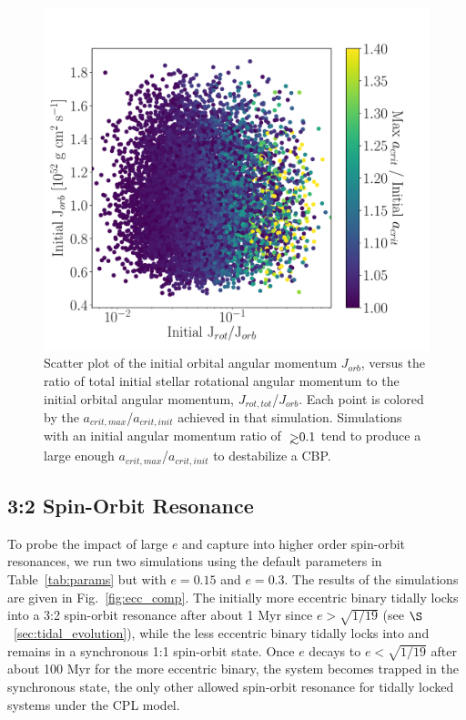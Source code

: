 \begin{figure}[h]
	\includegraphics[width=\columnwidth]{mc_uniform.pdf}
    \caption{Scatter plot of the initial orbital angular momentum $J_{orb}$, versus the ratio of total initial stellar rotational angular momentum to the initial orbital angular momentum, $J_{rot,tot}$/$J_{orb}$.  Each point is colored by the $a_{crit,max}$/$a_{crit,init}$ achieved in that simulation.  Simulations with an initial angular momentum ratio of ${\gsim}0.1$ tend to produce a large enough $a_{crit,max}$/$a_{crit,init}$ to destabilize a CBP.}
    \label{fig:mc_uniform}
\end{figure}

\subsection{3:2 Spin-Orbit Resonance} \label{sec:32}

To probe the impact of large $e$ and capture into higher order spin-orbit resonances, we run two simulations using the default parameters in Table~\ref{tab:params} but with $e = 0.15$ and $e = 0.3$.  The results of the simulations are given in Fig.~\ref{fig:ecc_comp}.  The initially more eccentric binary tidally locks into a 3:2 spin-orbit resonance after about 1 Myr since $e > \sqrt{1/19}$ (see $\S$~\ref{sec:tidal_evolution}), while the less eccentric binary tidally locks into and remains in a synchronous 1:1 spin-orbit state.  Once $e$ decays to $e < \sqrt{1/19}$ after about 100 Myr for the more eccentric binary, the system becomes trapped in the synchronous state, the only other allowed spin-orbit resonance for tidally locked systems under the CPL model.

